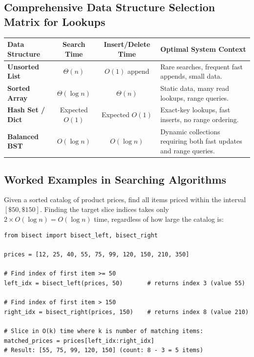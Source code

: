 \documentclass[11pt,a4paper]{article}
\begin{document}
\subsection{Comprehensive Data Structure Selection Matrix for Lookups}
\begin{center}
\begin{tabularx}{\textwidth}{p{3.2cm} c c X}
\toprule
\textbf{Data Structure} & \textbf{Search Time} & \textbf{Insert/Delete Time} & \textbf{Optimal System Context} \\
\midrule
\textbf{Unsorted List} & $\Theta(n)$ & $O(1)$ append & Rare searches, frequent fast appends, small data. \\
\textbf{Sorted Array} & $\Theta(\log n)$ & $\Theta(n)$ & Static data, many read lookups, range queries. \\
\textbf{Hash Set / Dict} & Expected $O(1)$ & Expected $O(1)$ & Exact-key lookups, fast inserts, no range ordering. \\
\textbf{Balanced BST} & $O(\log n)$ & $O(\log n)$ & Dynamic collections requiring both fast updates and range queries. \\
\bottomrule
\end{tabularx}
\end{center}

\subsection{Worked Examples in Searching Algorithms}

\begin{examplebox}
Given a sorted catalog of product prices, find all items priced within the interval $[\$50, \$150]$. Finding the target slice indices takes only $2 \times O(\log n) = O(\log n)$ time, regardless of how large the catalog is:
\end{examplebox}

\begin{lstlisting}[style=pythonstyle]
from bisect import bisect_left, bisect_right

prices = [12, 25, 40, 55, 75, 99, 120, 150, 210, 350]

# Find index of first item >= 50
left_idx = bisect_left(prices, 50)       # returns index 3 (value 55)

# Find index of first item > 150
right_idx = bisect_right(prices, 150)    # returns index 8 (value 210)

# Slice in O(k) time where k is number of matching items:
matched_prices = prices[left_idx:right_idx]
# Result: [55, 75, 99, 120, 150] (count: 8 - 3 = 5 items)
\end{lstlisting}
\end{document}
